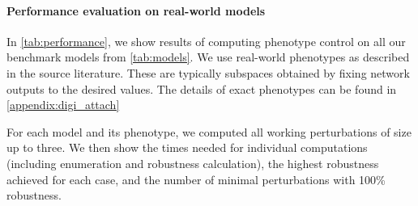 \paragraph{Performance evaluation on real-world models} In \autoref{tab:performance}, we show results of computing phenotype control on all our benchmark models from \autoref{tab:models}. We use real-world phenotypes as described in the source literature. These are typically subspaces obtained by fixing network outputs to the desired values. The details of exact phenotypes can be found in \autoref{appendix:digi_attach}

For each model and its phenotype, we computed all working perturbations of size up to three. We then show the times needed for individual computations (including enumeration and robustness calculation), the highest robustness achieved for each case, and the number of minimal perturbations with 100\% robustness.



